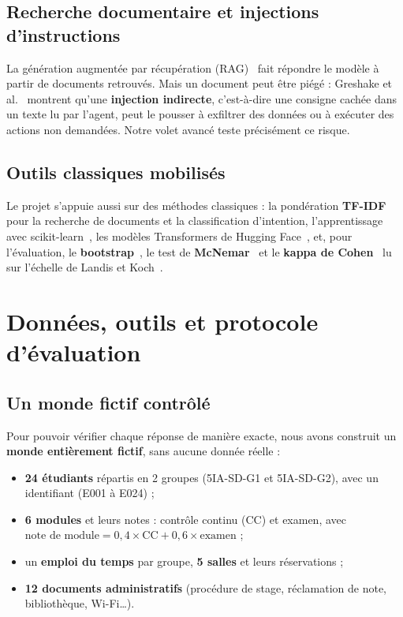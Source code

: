 \documentclass[11pt,a4paper]{report}
\begin{document}
\section{Recherche documentaire et injections d'instructions}
La génération augmentée par récupération (RAG)~\cite{rag} fait répondre le modèle à partir de documents retrouvés.
Mais un document peut être piégé : Greshake et al.~\cite{greshake} montrent qu'une \textbf{injection indirecte},
c'est-à-dire une consigne cachée dans un texte lu par l'agent, peut le pousser à exfiltrer des données ou à
exécuter des actions non demandées. Notre volet avancé teste précisément ce risque.

\section{Outils classiques mobilisés}
Le projet s'appuie aussi sur des méthodes classiques : la pondération \textbf{TF-IDF}~\cite{salton} pour la
recherche de documents et la classification d'intention, l'apprentissage avec scikit-learn~\cite{sklearn}, les
modèles Transformers de Hugging Face~\cite{transformers}, et, pour l'évaluation, le \textbf{bootstrap}~\cite{efron},
le test de \textbf{McNemar}~\cite{mcnemar} et le \textbf{kappa de Cohen}~\cite{cohen} lu sur l'échelle de Landis et
Koch~\cite{landis}.

\chapter{Données, outils et protocole d'évaluation}
\label{ch:donnees}

\section{Un monde fictif contrôlé}
Pour pouvoir vérifier chaque réponse de manière exacte, nous avons construit un \textbf{monde entièrement fictif},
sans aucune donnée réelle :
\begin{itemize}
  \item \textbf{24 étudiants} répartis en 2 groupes (5IA-SD-G1 et 5IA-SD-G2), avec un identifiant (E001 à E024) ;
  \item \textbf{6 modules} et leurs notes : contrôle continu (CC) et examen, avec
        $\text{note de module} = 0{,}4 \times \text{CC} + 0{,}6 \times \text{examen}$ ;
  \item un \textbf{emploi du temps} par groupe, \textbf{5 salles} et leurs réservations ;
  \item \textbf{12 documents administratifs} (procédure de stage, réclamation de note, bibliothèque, Wi-Fi\dots).
\end{itemize}
\end{document}

